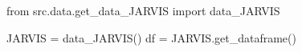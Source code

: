 from src.data.get_data_JARVIS import data_JARVIS

JARVIS = data_JARVIS()
df = JARVIS.get_dataframe()
